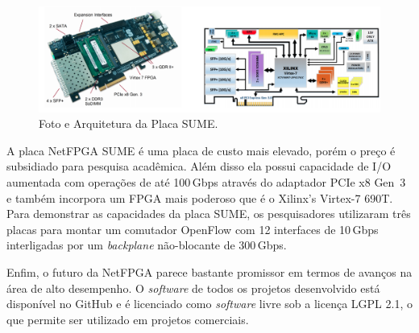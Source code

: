 \begin{figure}[h]
\centering
\includegraphics[scale=0.4]{figures/netfpga-rev/sume.png}
\caption{Foto e Arquitetura da Placa SUME.}
\label{fig:sume}
\end{figure}

A placa NetFPGA SUME é uma placa de custo mais elevado, porém o
preço é subsidiado para pesquisa acadêmica. Além disso ela possui
capacidade de I/O aumentada com operações de até 100\,Gbps através
do adaptador PCIe x8 Gen~3 e também incorpora um  FPGA mais poderoso
que é o Xilinx’s Virtex-7 690T. Para demonstrar as capacidades da
placa SUME, os pesquisadores utilizaram três placas para montar um
comutador OpenFlow com 12 interfaces de 10\,Gbps interligadas por um
\emph{backplane} não-blocante de 300\,Gbps.

Enfim, o futuro da NetFPGA parece bastante promissor em termos de
avanços na área de alto desempenho. O \textit{software} de todos os
projetos desenvolvido  está disponível no GitHub e é licenciado como
\emph{software} livre sob a licença LGPL 2.1, o que permite ser
utilizado em projetos comerciais.
